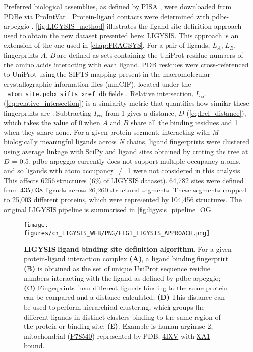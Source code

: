 Preferred biological assemblies, as defined by PISA \cite{KRISSINEL_2007_PISA}, were downloaded from PDBe via ProIntVar \cite{MACGOWAN_2020_DRSASP}. Protein-ligand contacts were determined with pdbe-arpeggio \cite{JUBB_2017_ARPEGGIO}. \autoref{fig:LIGYSIS_method} illustrates the ligand site definition approach used to obtain the new dataset presented here: LIGYSIS. This approach is an extension of the one used in \autoref{chap:FRAGSYS}. For a pair of ligands, $L_A$, $L_B$, fingerprints $A$, $B$ are defined as sets containing the UniProt residue numbers of the amino acids interacting with each ligand. PDB residues were cross-referenced to UniProt using the SIFTS mapping present in the macromolecular crystallographic information files (mmCIF), located under the \texttt{\_atom\_site.pdbx\_si\discretionary{-}{}{}fts\_xref\_db} fields \cite{VELANKAR_2012_SIFTS, DANA_2018_SIFTS}. Relative intersection, $I_{rel}$, (\autoref{eq:relative_intersection}) is a similarity metric that quantifies how similar these fingerprints are \cite{UTGES_2024_FRAGSYS}. Subtracting $I_{rel}$ from 1 gives a distance, $D$ (\autoref{eq:Irel_distance}), which takes the value of 0 when $A$ and $B$ share all the binding residues and 1 when they share none. For a given protein segment, interacting with \textit{M} biologically meaningful ligands across \textit{N} chains, ligand fingerprints were clustered using average linkage with SciPy \cite{VIRTANEN_2020_SCIPY} and ligand sites obtained by cutting the tree at $D$ = 0.5. pdbe-arpeggio currently does not support multiple occupancy atoms, and so ligands with atom occupancy $\neq$ 1 were not considered in this analysis. This affects 6256 structures (6\% of LIGYSIS dataset). 64,782 sites were defined from 435,038 ligands across 26,260 structural segments. These segments mapped to 25,003 different proteins, which were represented by 104,456 structures. The original LIGYSIS pipeline is summarised in \autoref{fig:ligysis_pipeline_OG}.

\begin{figure}[htb!]
    \centering
    \texttt{[image: figures/ch\_LIGYSIS\_WEB/PNG/FIG1\_LIGYSIS\_APPROACH.png]}
    \caption[LIGYSIS ligand binding site definition algorithm]{\textbf{LIGYSIS ligand binding site definition algorithm.} For a given protein-ligand interaction complex \textbf{(A)}, a ligand binding fingerprint \textbf{(B)} is obtained as the set of unique UniProt sequence residue numbers interacting with the ligand as defined by pdbe-arpeggio; \textbf{(C)} Fingerprints from different ligands binding to the same protein can be compared and a distance calculated; \textbf{(D)} This distance can be used to perform hierarchical clustering, which groups the different ligands in distinct clusters binding to the same region of the protein or binding site; \textbf{(E)}. Example is human arginase-2, mitochondrial (\href{https://www.uniprot.org/uniprotkb/P78540/entry}{P78540}) represented by PDB: \href{https://www.ebi.ac.uk/pdbe/entry/pdb/4ixv}{4IXV} \cite{GOLEBIOWSKI_2013_ARGINASE} with \href{https://www.ebi.ac.uk/pdbe-srv/pdbechem/chemicalCompound/show/XA1}{XA1} bound.}
    \label{fig:LIGYSIS_method}
\end{figure}

